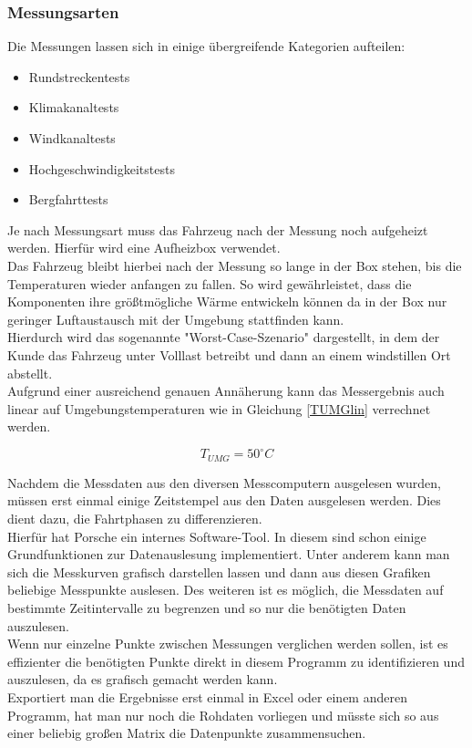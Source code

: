 \subsubsection{Messungsarten}

Die Messungen lassen sich in einige übergreifende Kategorien aufteilen: 

\begin{itemize}
	\item{Rundstreckentests}
	\item{Klimakanaltests}
	\item{Windkanaltests}
	\item{Hochgeschwindigkeitstests}
	\item{Bergfahrttests}
\end{itemize}

Je nach Messungsart muss das Fahrzeug nach der Messung noch aufgeheizt werden. Hierfür wird eine Aufheizbox verwendet. \\
Das Fahrzeug bleibt hierbei nach der Messung so lange in der Box stehen, bis die Temperaturen wieder anfangen zu fallen. So wird gewährleistet, dass die Komponenten ihre größtmögliche Wärme entwickeln können da in der Box nur geringer Luftaustausch mit der Umgebung stattfinden kann.\\

Hierdurch wird das sogenannte "Worst-Case-Szenario" dargestellt, in dem der Kunde das Fahrzeug unter Volllast betreibt und dann an einem windstillen Ort abstellt. \\
Aufgrund einer ausreichend genauen Annäherung kann das Messergebnis auch linear auf Umgebungstemperaturen wie in Gleichung \ref{TUMGlin} verrechnet werden.

\begin{equation}
	T_{UMG} = 50 ^{\circ} C
	\label{TUMGlin}
\end{equation}

Nachdem die Messdaten aus den diversen Messcomputern ausgelesen wurden, müssen erst einmal einige Zeitstempel aus den Daten ausgelesen werden. Dies dient dazu, die Fahrtphasen zu differenzieren.\\
Hierfür hat Porsche ein internes Software-Tool. In diesem sind schon einige Grundfunktionen zur Datenauslesung implementiert. Unter anderem kann man sich die Messkurven grafisch darstellen lassen und dann aus diesen Grafiken beliebige Messpunkte auslesen. Des weiteren ist es möglich, die Messdaten auf bestimmte Zeitintervalle zu begrenzen und so nur die benötigten Daten auszulesen.\\
Wenn nur einzelne Punkte zwischen Messungen verglichen werden sollen, ist es effizienter die benötigten Punkte direkt in diesem Programm zu identifizieren und auszulesen, da es grafisch gemacht werden kann. \\
Exportiert man die Ergebnisse erst einmal in Excel oder einem anderen Programm, hat man nur noch die Rohdaten vorliegen und müsste sich so aus einer beliebig großen Matrix die Datenpunkte zusammensuchen. \\

